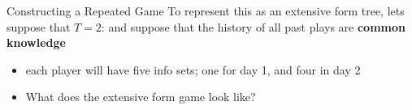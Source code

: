 

\begin{frame}{Constructing a Repeated Game}
  To represent this as an extensive form tree, lets suppose that $T=2$:
  and suppose that the history of all past plays are \textbf{common knowledge} 
  \begin{itemize}
    \item each player will have five info sets; one for day 1, and four in day 2 
    \item What does the extensive form game look like?
  \end{itemize}
\end{frame}

